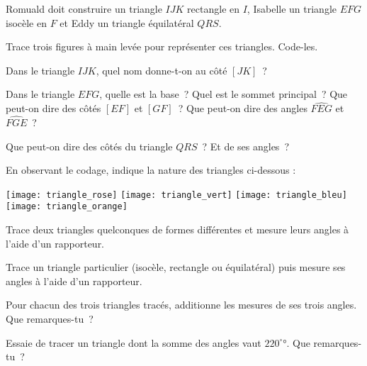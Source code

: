 \begin{activite}

Romuald doit construire un triangle $IJK$ rectangle en $I$, Isabelle un triangle $EFG$ isocèle en $F$ et Eddy un triangle équilatéral $QRS$.

\begin{partie}
Trace trois figures à main levée pour représenter ces triangles. Code-les.
\end{partie}

\begin{partie}
Dans le triangle $IJK$, quel nom donne-t-on au côté $[JK]$ ?
\end{partie}

\begin{partie}
Dans le triangle $EFG$, quelle est la base ? Quel est le sommet principal ? Que peut-on dire des côtés $[EF]$ et $[GF]$ ? Que peut-on dire des angles $\widehat{FEG}$ et $\widehat{FGE}$ ?
\end{partie}

\begin{partie}
Que peut-on dire des côtés du triangle $QRS$ ? Et de ses angles ?
\end{partie}

\begin{partie}
En observant le codage, indique la nature des triangles ci-dessous :

\texttt{[image: triangle\_rose]} \hfill \texttt{[image: triangle\_vert]} \hfill \texttt{[image: triangle\_bleu]} \hfill \texttt{[image: triangle\_orange]}
\end{partie}

\end{activite}


\begin{activite}

\begin{partie}
Trace deux triangles quelconques de formes différentes et mesure leurs angles à l'aide d'un rapporteur.
\end{partie}

\begin{partie}
Trace un triangle particulier (isocèle, rectangle ou équilatéral) puis mesure ses angles à l'aide d'un rapporteur.
\end{partie}

\begin{partie}
Pour chacun des trois triangles tracés, additionne les mesures de ses trois angles. Que remarques-tu ?
\end{partie}

\begin{partie}
Essaie de tracer un triangle dont la somme des angles vaut $220^\circ°$. Que remarques-tu ?
\end{partie}

\end{activite}


